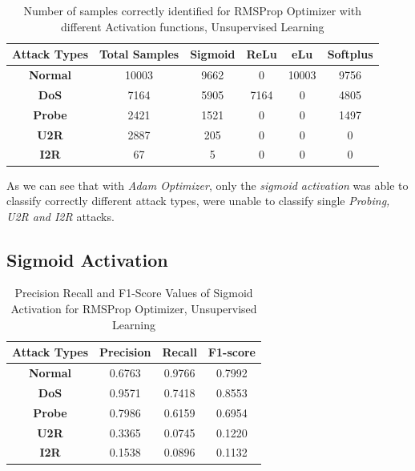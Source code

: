 \documentclass[12pt, a4paper]{report}
\begin{document}
\begin{appendices}
 
	\begin{table}[h]
	\centering
	\captionsetup{justification=centering,margin=2cm}
	\begin{tabular}{|c|c|c|c|c|c|}
	\hline
	\textbf{Attack Types} & \textbf{Total Samples} & \textbf{Sigmoid} & \textbf{ReLu} & \textbf{eLu} & \textbf{Softplus} \\ \hline
	\textbf{Normal}       & 10003                  & 9662            & 0         & 10003        & 9756           \\ \hline
	\textbf{DoS}          & 7164                  & 5905            & 7164         & 0        & 4805             \\ \hline
	\textbf{Probe}        & 2421                  & 1521             & 0          & 0         & 1497              \\ \hline
	\textbf{U2R}          & 2887                    & 205             & 0           & 0          & 0               \\ \hline
	\textbf{I2R}          & 67                     & 5               & 0            & 0           & 0                \\ \hline
	\end{tabular}
	\caption{Number of samples correctly identified for RMSProp Optimizer with different Activation functions, Unsupervised Learning}
	\label{confusion_RMSProp_tf}
	\end{table}
  
  As we can see that with \textit{Adam Optimizer}, only the \textit{sigmoid activation} was able to classify correctly different attack types, were unable to classify single \textit{Probing, U2R and I2R} attacks.
   \clearpage
   \subsection{Sigmoid Activation}
 	 \begin{table}[ht]
		\centering
		\captionsetup{justification=centering,margin=2cm}
		\begin{tabular}{|c|c|c|c|}
		\hline
		\textbf{Attack Types} & \textbf{Precision} & \textbf{Recall} & \textbf{F1-score} \\ \hline
		\textbf{Normal}       & 0.6763             & 0.9766          & 0.7992            \\ \hline
		\textbf{DoS}          & 0.9571             & 0.7418          & 0.8553            \\ \hline
		\textbf{Probe}        & 0.7986             & 0.6159          & 0.6954            \\ \hline
		\textbf{U2R}          & 0.3365             & 0.0745          & 0.1220            \\ \hline
		\textbf{I2R}          & 0.1538             & 0.0896          & 0.1132            \\ \hline
		\end{tabular}
		\caption{Precision Recall and F1-Score Values of Sigmoid Activation for RMSProp Optimizer, Unsupervised Learning}
		\label{classification sigmoid RMSProp tf}
		\end{table} 
  

\end{appendices}
\end{document}
